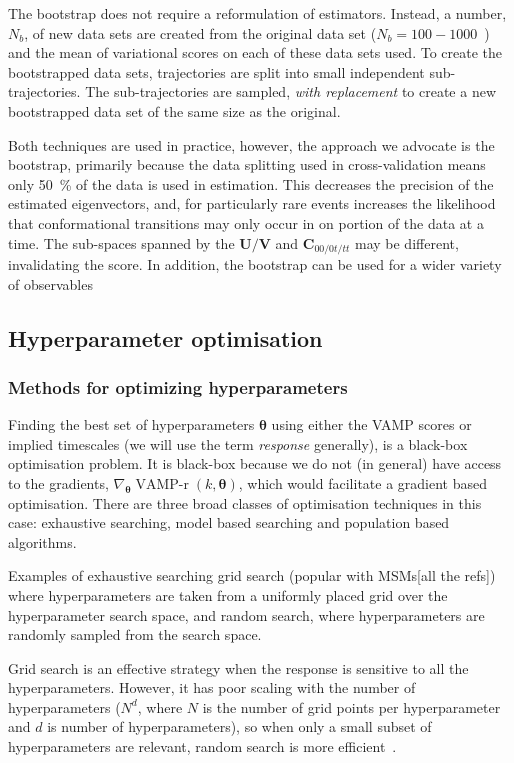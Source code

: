 \documentclass[journal=jacsat,manuscript=article]{achemso}
\begin{document}
The bootstrap does not require a reformulation of estimators. Instead, a number, $N_b$, of new data sets are created from the original data set ($N_b = 100 - 1000$~\cite{efronIntroductionBootstrap1993}) and the mean of variational scores on each of these data sets used. To create the bootstrapped data sets, 
trajectories are split into small independent sub-trajectories. The sub-trajectories are sampled, \emph{with replacement} to create a new bootstrapped data set of the same size as the original. 

Both techniques are used in practice, however, the approach we  advocate is the bootstrap, primarily because the data splitting used in cross-validation means only \SI{50}{\percent} of the data is used in estimation.  This decreases the precision of the estimated eigenvectors, and, for particularly rare events increases the likelihood  that conformational transitions may only occur in on portion of the data at a time. The sub-spaces spanned by the $\mathbf{U}/\mathbf{V}$ and $\mathbf{C}_{00/0t/tt}$ may be different, invalidating the score. In addition, the bootstrap can be used for a wider variety of observables 
 
\subsection{Hyperparameter optimisation}

\subsubsection{Methods for optimizing hyperparameters}

Finding the best set of hyperparameters $\bm{\theta}$ using either the VAMP scores or implied timescales (we will use the term \emph{response} generally), is a black-box optimisation problem.  It is black-box because we do not (in general) have access to the gradients, $\nabla_{\bm{\theta}} \operatorname{VAMP-r}(k, \bm{\theta})$, which would facilitate a gradient based optimisation.  There are three broad classes of optimisation techniques in this case: exhaustive searching,  model based searching and population based algorithms. 

Examples of exhaustive searching grid search (popular with MSMs[all the refs]) where hyperparameters are taken from a uniformly placed grid over the hyperparameter search space, and random search, where hyperparameters are randomly sampled from the search space. 

Grid search is an effective strategy when the response is sensitive to all the hyperparameters.  However, it has poor scaling with the number of hyperparameters ($N^d$, where $N$ is the number of grid points per hyperparameter and $d$ is number of hyperparameters), so when only a small subset of hyperparameters are relevant, random search is more efficient~\cite{bergstra_jamesbergstra_random_2012}.  
\end{document}
